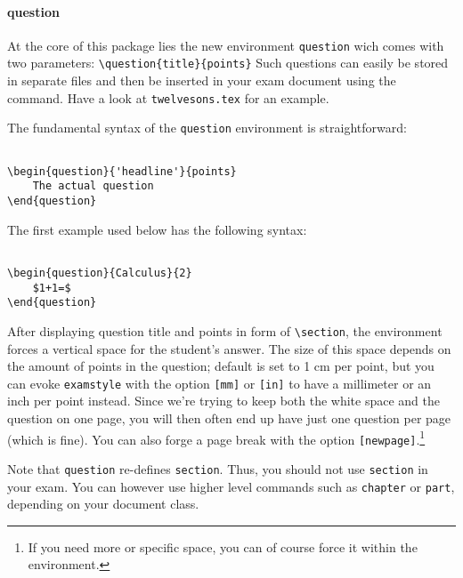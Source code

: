 \documentclass[a4paper]{scrartcl}
\begin{document}
\paragraph{question}
At the core of this package lies the new environment \verb|question| wich comes with two parameters: \verb+\question{title}{points}+ Such questions can easily be stored in separate files and then be inserted in your exam document using the \verb|| command. Have a look at \verb|twelvesons.tex| for an example.

The fundamental syntax of the \verb|question| environment is straightforward:

\begin{verbatim}

\begin{question}{'headline'}{points}
	The actual question
\end{question}

\end{verbatim}

\noindent
The first example used below has the following syntax:

\begin{verbatim}

\begin{question}{Calculus}{2}
	$1+1=$
\end{question}

\end{verbatim}

\noindent
After displaying question title and points in form of \verb|\section|, the environment forces a vertical space for the student's answer. The size of this space depends on the amount of points in the question; default is set to 1 cm per point, but you can evoke \verb|examstyle| with the option \verb|[mm]| or \verb|[in]| to have a millimeter or an inch per point instead. Since we're trying to keep both the white space and the question on one page, you will then often end up have just one question per page (which is fine). You can also forge a page break with the option \verb|[newpage]|.\footnote{If you need more or specific space, you can of course force it within the environment.} 

Note that \verb|question| re-defines \verb|section|. Thus, you should not use  \verb|section| in your exam. You can however use higher level commands such as \verb|chapter| or \verb|part|, depending on your document class.
\end{document}
